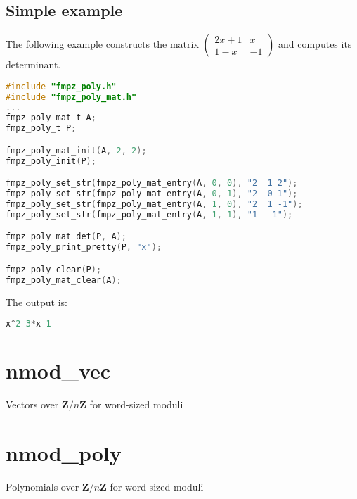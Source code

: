 \documentclass[a4paper,10pt]{book}
\newcommand{\Z}{\mathbf{Z}}%
\begin{document}
{{\section{Simple example}

The following example constructs the matrix
$\begin{pmatrix} 2x+1 & x \\ 1-x & -1 \end{pmatrix}$ and computes
its determinant.

\begin{lstlisting}[language=c]
#include "fmpz_poly.h"
#include "fmpz_poly_mat.h"
...
fmpz_poly_mat_t A;
fmpz_poly_t P;

fmpz_poly_mat_init(A, 2, 2);
fmpz_poly_init(P);

fmpz_poly_set_str(fmpz_poly_mat_entry(A, 0, 0), "2  1 2");
fmpz_poly_set_str(fmpz_poly_mat_entry(A, 0, 1), "2  0 1");
fmpz_poly_set_str(fmpz_poly_mat_entry(A, 1, 0), "2  1 -1");
fmpz_poly_set_str(fmpz_poly_mat_entry(A, 1, 1), "1  -1");

fmpz_poly_mat_det(P, A);
fmpz_poly_print_pretty(P, "x");

fmpz_poly_clear(P);
fmpz_poly_mat_clear(A);
\end{lstlisting}

The output is:
\begin{lstlisting}[language=c]
x^2-3*x-1
\end{lstlisting}




\chapter{nmod\_vec}
\epigraph{Vectors over $\Z / n \Z$ for word-sized moduli}{}




\chapter{nmod\_poly}
\epigraph{Polynomials over $\Z / n \Z$ for word-sized moduli}{}

}}
\end{document}
